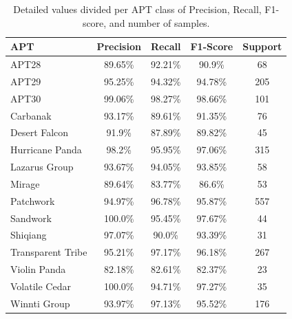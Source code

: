 \begin{table}[!h]
	
	\centering
	\caption{Detailed values divided per APT class of Precision, Recall, F1-score, and number of samples.}
	\label{tab:per-class}
	\begin{tabular}{lcccc}
		\toprule
		APT & Precision & Recall & F1-Score & Support \\
		\midrule
		APT28 & 89.65\% & 92.21\% & 90.9\% & 68 \\
		
		APT29 & 95.25\% & 94.32\% & 94.78\% & 205 \\
		
		APT30 & 99.06\% & 98.27\% & 98.66\% & 101 \\
		
		Carbanak & 93.17\% & 89.61\% & 91.35\% & 76 \\
		
		Desert Falcon & 91.9\% & 87.89\% & 89.82\% & 45 \\
		
		Hurricane Panda & 98.2\% & 95.95\% & 97.06\% & 315 \\
		
		Lazarus Group & 93.67\% & 94.05\% & 93.85\% & 58 \\
		
		Mirage & 89.64\% & 83.77\% & 86.6\% & 53 \\
		
		Patchwork & 94.97\% & 96.78\% & 95.87\% & 557 \\
		
		Sandwork & 100.0\% & 95.45\% & 97.67\% & 44 \\
		
		Shiqiang & 97.07\% & 90.0\% & 93.39\% & 31 \\
		
		Transparent Tribe & 95.21\% & 97.17\% & 96.18\% & 267 \\
		
		Violin Panda & 82.18\% & 82.61\% & 82.37\% & 23 \\
		
		Volatile Cedar & 100.0\% & 94.71\% & 97.27\% & 35 \\
		
		Winnti Group & 93.97\% & 97.13\% & 95.52\% & 176 \\
		\bottomrule
		
	\end{tabular}
\end{table}



